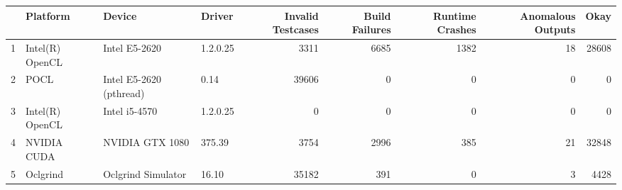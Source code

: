 \begin{tabular}{llllrrrrr}
\toprule
{} &         Platform &                   Device &    Driver &  Invalid Testcases &  Build Failures &  Runtime Crashes &  Anomalous  Outputs &   Okay \\
\midrule
1 &  Intel(R) OpenCL &            Intel E5-2620 &  1.2.0.25 &               3311 &            6685 &             1382 &                  18 &  28608 \\
2 &             POCL &  Intel E5-2620 (pthread) &      0.14 &              39606 &               0 &                0 &                   0 &      0 \\
3 &  Intel(R) OpenCL &            Intel i5-4570 &  1.2.0.25 &                  0 &               0 &                0 &                   0 &      0 \\
4 &      NVIDIA CUDA &          NVIDIA GTX 1080 &    375.39 &               3754 &            2996 &              385 &                  21 &  32848 \\
5 &         Oclgrind &       Oclgrind Simulator &     16.10 &              35182 &             391 &                0 &                   3 &   4428 \\
\bottomrule
\end{tabular}
